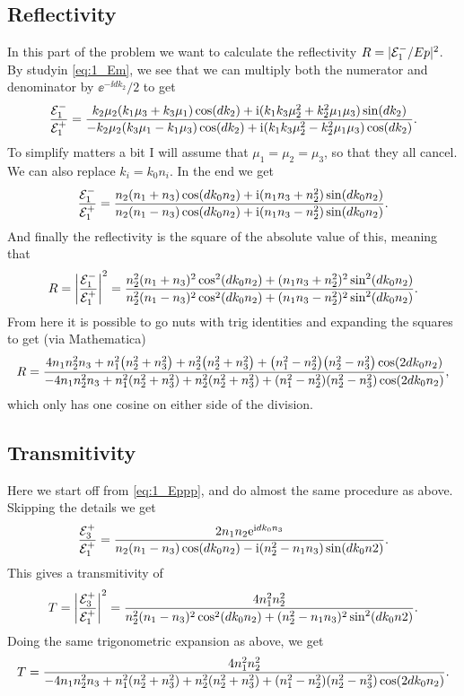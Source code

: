 \documentclass[11pt,letter, swedish, english
]{article}
\begin{document}
\subsection{Reflectivity}
In this part of the problem we want to calculate the reflectivity
$R=|{\mathcal{E}_1^-}/Ep|^2$. By studyin \eqref{eq:1_Em}, we see that we can
multiply both the numerator and denominator by $\ee^{-\ii dk_2}/2$ to
get
\begin{equation}
\frac{{\mathcal{E}_1^-}}{{\mathcal{E}_1^+}}=
\frac{k_2\mu_2(k_1\mu_3 + k_3\mu_1)\cos(dk_2) 
+\mathrm{i}(k_1k_3\mu_2^2 + k_2^2\mu_1\mu_3)\sin(dk_2) 
}{
-k_2\mu_2(k_3\mu_1 - k_1\mu_3)\cos(dk_2) 
+\mathrm{i}(k_1k_3\mu_2^2 - k_2^2\mu_1\mu_3)\cos(dk_2) 
}.
\end{equation}
To simplify matters a bit I will assume that $\mu_1=\mu_2=\mu_3$, so
that they all cancel. We can also replace $k_i=k_0n_i$. In the end we
get
\begin{equation}
\frac{{\mathcal{E}_1^-}}{{\mathcal{E}_1^+}}=
\frac{n_2(n_1 + n_3)\cos(dk_0n_2) 
+\mathrm{i}(n_1n_3 + n_2^2)\sin(dk_0n_2) 
}{
n_2(n_1 - n_3)\cos(dk_0n_2) 
+\mathrm{i}(n_1n_3 - n_2^2)\sin(dk_0n_2) 
}.
\end{equation}
And finally the reflectivity is the square of the absolute value of
this, meaning that
\begin{equation}
R = \abs{\frac{{\mathcal{E}_1^-}}{{\mathcal{E}_1^+}}}^2=
\frac{n_2^2(n_1 + n_3)^2\cos^2(dk_0n_2) 
+(n_1n_3 + n_2^2)^2\sin^2(dk_0n_2) 
}{
n_2^2(n_1 - n_3)^2\cos^2(dk_0n_2) 
+(n_1n_3 - n_2^2)^2\sin^2(dk_0n_2) 
}.
\end{equation}
From here it is possible to go nuts with trig identities and expanding
the squares to get (via Mathematica) 
\begin{equation}
R = 
\frac{4n_1n_2^2n_3 + n_1^2\qty(n_2^2 + n_3^2) 
+n_2^2\qty(n_2^2 + n_3^2) + \qty(n_1^2 - n_2^2)\qty(n_2^2 - n_3^2) 
\cos(2dk_0n_2)
}{
-4n_1n_2^2n_3 + n_1^2\qty(n_2^2 + n_3^2) 
+n_2^2\qty(n_2^2 + n_3^2) + \qty(n_1^2 - n_2^2)\qty(n_2^2 - n_3^2) 
\cos(2dk_0n_2)
},
\end{equation}
which only has one cosine on either side of the division.


\subsection{Transmitivity}
Here we start off from \eqref{eq:1_Eppp}, and do almost the same
procedure as above. Skipping the details we get
\begin{equation}
\frac{{\mathcal{E}_3^+}}{{\mathcal{E}_1^+}} = 
\frac{
2n_1n_2 \mathrm{e}^{\mathrm{i} dk_0n_3}
}{
n_2(n_1 - n_3)\cos(dk_0n_2) - \mathrm{i} (n_2^2 - n_1n_3)\sin(dk_0n2)}.
\end{equation}
This gives a transmitivity of
\begin{equation}
T = \abs{\frac{{\mathcal{E}_3^+}}{{\mathcal{E}_1^+}}}^2 = 
\frac{
4n_1^2n_2^2
}{
n_2^2(n_1 - n_3)^2\cos^2(dk_0n_2) + (n_2^2 - n_1n_3)^2\sin^2(dk_0n2)}.
\end{equation}
Doing the same trigonometric expansion as above, we get
\begin{equation}
T = 
\frac{
4n_1^2n_2^2
}{
-4n_1n_2^2n_3 + n_1^2\qty(n_2^2 + n_3^2) 
+n_2^2\qty(n_2^2 + n_3^2) + \qty(n_1^2 - n_2^2)\qty(n_2^2 - n_3^2) 
\cos(2dk_0n_2)
}.
\end{equation}
\end{document}
